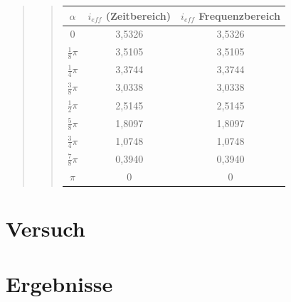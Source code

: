 \begin{quote}
\begin{quote}
\begin{center}
\begin{tabular}{|c|c|c|}
                   \hline
                   $\alpha $ & $i_{eff}$ (Zeitbereich) & $i_{eff}$ Frequenzbereich\\ \hline
                   $0$ & 3,5326 & 3,5326 \\ \hline
                   $\frac{1}{8} \pi$ & 3,5105 & 3,5105 \\ \hline
                   $\frac{1}{4} \pi$ & 3,3744 & 3,3744 \\ \hline
                   $\frac{3}{8} \pi$ & 3,0338 & 3,0338 \\ \hline
                   $\frac{1}{2} \pi$ & 2,5145 & 2,5145 \\ \hline
                   $\frac{5}{8} \pi$ & 1,8097 & 1,8097 \\ \hline
                   $\frac{3}{4} \pi$ & 1,0748 & 1,0748 \\ \hline
                   $\frac{7}{8} \pi$ & 0,3940 & 0,3940 \\ \hline
                   $ \pi$ & 0 & 0 \\ \hline
                         
           
                 \end{tabular}
             \end{center}        
        
        
    \end{quote}
\end{quote}


\section{Versuch}
\begin{quote}
	
\end{quote}


\section{Ergebnisse}
\begin{quote}
	
\end{quote}

